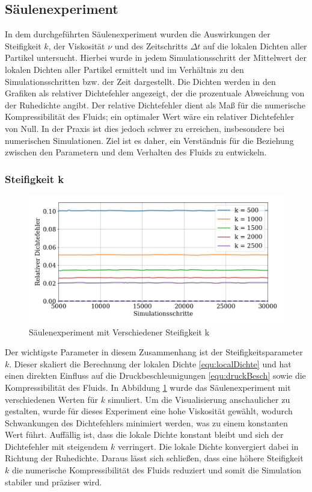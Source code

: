 \documentclass[a4paper, 12pt]{article}
\begin{document}
\subsection{Säulenexperiment}

In dem durchgeführten Säulenexperiment wurden die Auswirkungen der Steifigkeit \(k\), der Viskosität \(\nu\) und des Zeitschritts \(\Delta t\) auf die lokalen Dichten aller Partikel untersucht. Hierbei wurde in jedem Simulationsschritt der Mittelwert der lokalen Dichten aller Partikel ermittelt und im Verhältnis zu den Simulationsschritten bzw. der Zeit dargestellt. Die Dichten werden in den Grafiken als relativer Dichtefehler angezeigt, der die prozentuale Abweichung von der Ruhedichte angibt. Der relative Dichtefehler dient als Maß für die numerische Kompressibilität des Fluids; ein optimaler Wert wäre ein relativer Dichtefehler von Null. In der Praxis ist dies jedoch schwer zu erreichen, insbesondere bei numerischen Simulationen. Ziel ist es daher, ein Verständnis für die Beziehung zwischen den Parametern und dem Verhalten des Fluids zu entwickeln.

\subsubsection{Steifigkeit k}
\begin{figure}[H]
	\centering
	\includegraphics[width=.85\textwidth]{graphics/Steifigkeit.png}	
	\caption{Säulenexperiment mit Verschiedener Steifigkeit k}
	\label{Säulenexperiment_k}
\end{figure}

Der wichtigste Parameter in diesem Zusammenhang ist der Steifigkeitsparameter \(k\). Dieser skaliert die Berechnung der lokalen Dichte \eqref{equ:localDichte} und hat einen direkten Einfluss auf die Druckbeschleunigungen \eqref{equ:druckBesch} sowie die Kompressibilität des Fluids. In Abbildung \ref{Säulenexperiment_k} wurde das Säulenexperiment mit verschiedenen Werten für \(k\) simuliert. Um die Visualisierung anschaulicher zu gestalten, wurde für dieses Experiment eine hohe Viskosität gewählt, wodurch Schwankungen des Dichtefehlers minimiert werden, was zu einem konstanten Wert führt. Auffällig ist, dass die lokale Dichte konstant bleibt und sich der Dichtefehler mit steigendem \(k\) verringert. Die lokale Dichte konvergiert dabei in Richtung der Ruhedichte. Daraus lässt sich schließen, dass eine höhere Steifigkeit \(k\) die numerische Kompressibilität des Fluids reduziert und somit die Simulation stabiler und präziser wird.
\end{document}
